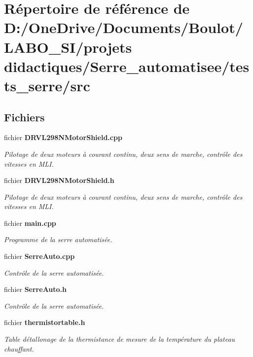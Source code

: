 \section{Répertoire de référence de D\+:/\+One\+Drive/\+Documents/\+Boulot/\+L\+A\+B\+O\+\_\+\+S\+I/projets didactiques/\+Serre\+\_\+automatisee/tests\+\_\+serre/src}
\label{dir_68267d1309a1af8e8297ef4c3efbcdba}
\subsection*{Fichiers}
\begin{DoxyCompactItemize}
\item 
fichier \textbf{ D\+R\+V\+L298\+N\+Motor\+Shield.\+cpp}
\begin{DoxyCompactList}\small\item\em Pilotage de deux moteurs à courant continu, deux sens de marche, contrôle des vitesses en M\+LI. \end{DoxyCompactList}\item 
fichier \textbf{ D\+R\+V\+L298\+N\+Motor\+Shield.\+h}
\begin{DoxyCompactList}\small\item\em Pilotage de deux moteurs à courant continu, deux sens de marche, contrôle des vitesses en M\+LI. \end{DoxyCompactList}\item 
fichier \textbf{ main.\+cpp}
\begin{DoxyCompactList}\small\item\em Programme de la serre automatisée. \end{DoxyCompactList}\item 
fichier \textbf{ Serre\+Auto.\+cpp}
\begin{DoxyCompactList}\small\item\em Contrôle de la serre automatisée. \end{DoxyCompactList}\item 
fichier \textbf{ Serre\+Auto.\+h}
\begin{DoxyCompactList}\small\item\em Contrôle de la serre automatisée. \end{DoxyCompactList}\item 
fichier \textbf{ thermistortable.\+h}
\begin{DoxyCompactList}\small\item\em Table d\textquotesingle{}étallonage de la thermistance de mesure de la température du plateau chauffant. \end{DoxyCompactList}\end{DoxyCompactItemize}
